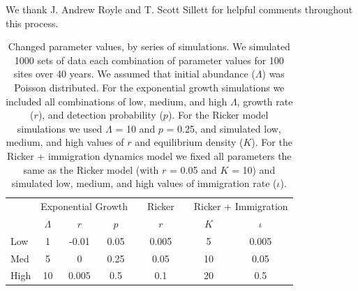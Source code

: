 \documentclass[12pt]{article}
\begin{document}
We thank J. Andrew Royle and T. Scott Sillett for helpful comments
throughout this process.




\newpage



\begin{table}[t]
  \centering
  \caption{Changed parameter values, by series of simulations.  We
    simulated 1000 sets of data each combination of parameter values
    for 100 sites over 40 years.  We assumed that initial abundance
    ($\Lambda$) was Poisson distributed.  For the exponential growth
    simulations we included all combinations of low, medium, and high
    $\Lambda$, growth rate ($r$), and detection probability ($p$).  For the Ricker
    model simulations we used $\Lambda$ = 10 and $p$ = 0.25, and simulated low,
    medium, and high values of $r$ and equilibrium density ($K$).  For the
    Ricker + immigration dynamics model we fixed all parameters the
    same as the Ricker model (with $r$ = 0.05 and $K$ = 10) and simulated
    low, medium, and high values of immigration rate ($\iota$).}
  \begin{tabular}{lcccccccc}
    \hline
    & \multicolumn{3}{c}{Exponential Growth} && Ricker &&
    \multicolumn{2}{c}{Ricker + Immigration} \\
    \cline{2-4}     \cline{6-6}    \cline{8-9}
                & $\Lambda$ & $r$ & $p$ && $r$  && $K$ & $\iota$  \\
    \hline
    Low	        &1	&-0.01	&0.05	&&0.005	&&5	&0.005  \\
    Med	        &5	&0	&0.25	&&0.05	&&10	&0.05   \\
    High	&10	&0.005	&0.5	&&0.1	&&20	&0.5    \\
    \hline
  \end{tabular}
\end{table}

\vfill
\newpage
\end{document}
